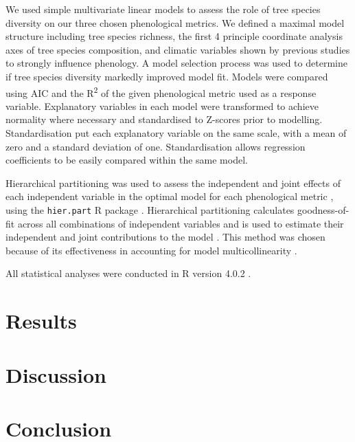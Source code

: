 \documentclass[11pt,a4paper]{article}
\begin{document}
We used simple multivariate linear models to assess the role of tree species diversity on our three chosen phenological metrics. We defined a maximal model structure including tree species richness, the first 4 principle coordinate analysis axes of tree species composition, and climatic variables shown by previous studies to strongly influence phenology. A model selection process was used to determine if tree species diversity markedly improved model fit. Models were compared using AIC and the R\textsuperscript{2} of the given phenological metric used as a response variable. Explanatory variables in each model were transformed to achieve normality where necessary and standardised to Z-scores prior to modelling. Standardisation put each explanatory variable on the same scale, with a mean of zero and a standard deviation of one. Standardisation allows regression coefficients to be easily compared within the same model.

Hierarchical partitioning was used to assess the independent and joint effects of each independent variable in the optimal model for each phenological metric \citep{Chevan1991, MacNally2002}, using the \texttt{hier.part} R package \citep{hier.part2004}. Hierarchical partitioning calculates goodness-of-fit across all combinations of independent variables \cite{Walsh2013} and is used to estimate their independent and joint contributions to the model \citep{MacNally2002}. This method was chosen because of its effectiveness in accounting for model multicollinearity \citep{Olea2010}. 

All statistical analyses were conducted in R version 4.0.2 \citep{RCoreTeam2020}.

\section{Results}

\section{Discussion}

\section{Conclusion}
\end{document}
